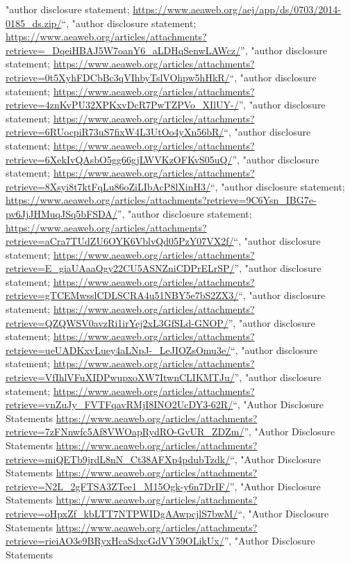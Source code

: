 \documentclass[]{article}
\begin{document}
\begin{itemize}
  "author disclosure statement;
  \url{https://www.aeaweb.org/aej/app/ds/0703/2014-0185_ds.zip/}``,
  "author disclosure statement;
  \url{https://www.aeaweb.org/articles/attachments?retrieve=_DqeiHBAJ5W7oanY6_aLDHqSenwLAWcz/}'',
  "author disclosure statement;
  \url{https://www.aeaweb.org/articles/attachments?retrieve=0t5XyhFDCbBc3qVIhbyTslVOhpw5hHkR/}``,
  "author disclosure statement;
  \url{https://www.aeaweb.org/articles/attachments?retrieve=4znKvPU32XPKxvDcR7PwTZPVo_XIlUY-/}'',
  "author disclosure statement;
  \url{https://www.aeaweb.org/articles/attachments?retrieve=6RUocpiR73uS7fixW4L3UtOo4yXn56bR/}``,
  "author disclosure statement;
  \url{https://www.aeaweb.org/articles/attachments?retrieve=6XekIvQAsbO5gg66gjLWVKzOFKvS05uQ/}'',
  "author disclosure statement;
  \url{https://www.aeaweb.org/articles/attachments?retrieve=8Xsyi8t7ktFqLu86oZiLIbAcP8lXinH3/}``,
  "author disclosure statement;
  \url{https://www.aeaweb.org/articles/attachments?retrieve=9C6Ysn_IBG7e-pv6JjJHMuqJSq5bFSDA/}'',
  "author disclosure statement;
  \url{https://www.aeaweb.org/articles/attachments?retrieve=aCra7TUdZU6OYK6VblvQd05PzY07VX2f/}``,
  "author disclosure statement;
  \url{https://www.aeaweb.org/articles/attachments?retrieve=E_giaUAaaQgy22CU5ASNZniCDPrELrSP/}'',
  "author disclosure statement;
  \url{https://www.aeaweb.org/articles/attachments?retrieve=gTCEMwsslCDLSCRA4u51NBY5e7bS2ZX3/}``,
  "author disclosure statement;
  \url{https://www.aeaweb.org/articles/attachments?retrieve=QZQWSV0avzRi1irYej2xL3GfSLd-GNOP/}'',
  "author disclosure statement;
  \url{https://www.aeaweb.org/articles/attachments?retrieve=ueUADKxvLuey4aLNpJ-_LeJIOZsOmu3e/}``,
  "author disclosure statement;
  \url{https://www.aeaweb.org/articles/attachments?retrieve=VfIhlVFuXIDPwupxoXW7ItwnCLIKMTJu/}'',
  "author disclosure statement;
  \url{https://www.aeaweb.org/articles/attachments?retrieve=vnZuJy_FVTFqavRMjI8INO2UcDY3-62R/}``,
  "Author Disclosure Statements
  \url{https://www.aeaweb.org/articles/attachments?retrieve=7zFNnwfc5Af8VWOapRydRO-GvUR_ZDZm/}'',
  "Author Disclosure Statements
  \url{https://www.aeaweb.org/articles/attachments?retrieve=miQETb9jrdL8nN_Ct38AFXp4pdubTzdk/}``,
  "Author Disclosure Statements
  \url{https://www.aeaweb.org/articles/attachments?retrieve=N2L_2gFTSA3ZTee1_M15Ogk-y6n7DrIF/}'',
  "Author Disclosure Statements
  \url{https://www.aeaweb.org/articles/attachments?retrieve=oHpxZf_kbLTT7NTPWIDgAAwpcjlS7bwM/}``,
  "Author Disclosure Statements
  \url{https://www.aeaweb.org/articles/attachments?retrieve=rieiAO3e9BRyxHcaSdxcGdVY59OLikUx/}'',
  "Author Disclosure Statements

\end{itemize}
\end{document}
